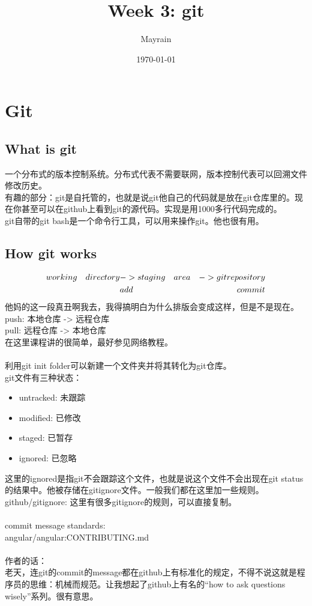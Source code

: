 \documentclass{article}
\title{Week 3: git}
\author{Mayrain}
\date{\today}
\begin{document}
\maketitle

\section{Git}

\subsection{What is git}

\noindent
一个分布式的版本控制系统。分布式代表不需要联网，版本控制代表可以回溯文件修改历史。\\
有趣的部分：git是自托管的，也就是说git他自己的代码就是放在git仓库里的。现在你甚至可以在github上看到git的源代码。实现是用1000多行代码完成的。\\
git自带的git bash是一个命令行工具，可以用来操作git。他也很有用。\\

\subsection{How git works}

\noindent
\begin{align}
    working\quad directory & -> staging\quad area & ->  git  repository \notag \\
                           & add                  & commit \notag
\end{align}
他妈的这一段真丑啊我去，我得搞明白为什么排版会变成这样，但是不是现在。\\
push: 本地仓库 -> 远程仓库\\
pull: 远程仓库 -> 本地仓库\\
在这里课程讲的很简单，最好参见网络教程。\\
\\
利用git init folder可以新建一个文件夹并将其转化为git仓库。\\
git文件有三种状态：
\begin{itemize}
    \item untracked: 未跟踪
    \item modified: 已修改
    \item staged: 已暂存
    \item ignored: 已忽略
\end{itemize}
这里的ignored是指git不会跟踪这个文件，也就是说这个文件不会出现在git status的结果中。他被存储在gitignore文件。一般我们都在这里加一些规则。\\
github/gitignore: 这里有很多gitignore的规则，可以直接复制。\\
\\
commit message standards:\\
angular/angular:CONTRIBUTING.md\\
\\
作者的话：\\
老天，连git的commit的message都在github上有标准化的规定，不得不说这就是程序员的思维：机械而规范。让我想起了github上有名的“how to ask questions wisely”系列。很有意思。\\
\end{document}
